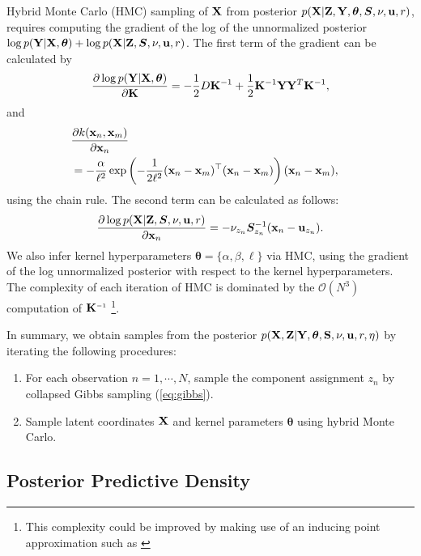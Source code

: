 Hybrid Monte Carlo (HMC) sampling of $\mathbf{X}$ from posterior 
${p(\mathbf{X}|\mathbf{Z},\mathbf{Y},\bm{\theta},\bm{S},\nu,{\bf{u}},r)}$,
requires computing the gradient of the log of the unnormalized posterior
${\log p(\mathbf{Y}|\mathbf{X},\bm{\theta})+\log p(\mathbf{X}|\mathbf{Z},\bm{S},\nu,{\bf{u}},r)}$. 
The first term of the gradient can be calculated by
\begin{align}
\frac{\partial \log p(\mathbf{Y} | \mathbf{X},\bm{\theta})}{\partial \mathbf{K}} = -\frac{1}{2}D\mathbf{K}^{-1}+\frac{1}{2}\mathbf{K}^{-1} \mathbf{Y} \mathbf{Y}^{T} \mathbf{K}^{-1}, 
\end{align}
and
\begin{align}
\lefteqn{\pderiv{k(\vx_{n},\vx_{m})}{\vx_n}}
\nonumber \\
&= - \frac{\alpha}{\ell^2} \exp \left( - \frac{1}{2 \ell^2} (\vx_n - \vx_m)^{\top} (\vx_n - \vx_m) \right) (\vx_n - \vx_m),
\end{align}
using the chain rule.
The second term can be calculated as follows:
\begin{align}
\frac{\partial \log p(\mathbf{X}|\mathbf{Z},\bm{S},\nu,{\bf{u}},r)}{\partial {\bf{x}}_{n}} 
= -\nu_{z_{n}}\bm{S}_{z_{n}}^{-1}({\bf{x}}_{n}-{\bf{u}}_{z_{n}}).
\end{align}
We also infer kernel hyperparameters $\bm{\theta}=\{\alpha,\beta,\ell\}$ via HMC, using the gradient of the log unnormalized posterior with respect to the kernel hyperparameters.
The complexity of each iteration of HMC is dominated by the $\mathcal{O}(N^3)$ computation of $\vK\inv$
\footnote{This complexity could be improved by making use of an inducing point approximation such as \cite{quinonero2005unifying,snelson2006sparse}}.


In summary, we obtain samples from the posterior $p(\mathbf{X},\mathbf{Z}|\mathbf{Y},\bm{\theta},\mathbf{S},\nu,{\bf{u}},r,\eta)$ 
by iterating the following procedures:
\begin{enumerate}
\item For each observation $n=1,\cdots,N$,
sample the component assignment $z_{n}$ by collapsed Gibbs sampling (\ref{eq:gibbs}).
\item Sample latent coordinates $\mathbf{X}$ and kernel parameters $\bm{\theta}$ using hybrid Monte Carlo.
\end{enumerate}


\subsection{Posterior Predictive Density}

